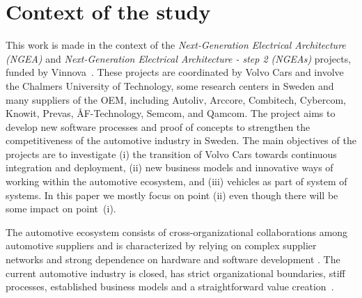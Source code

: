 \section{Context of the study}\label{sec:context}


This work is made in the context of the {\em Next-Generation Electrical Architecture (NGEA)} and {\em Next-Generation Electrical Architecture - step 2 (NGEAs)} projects, funded by Vinnova~\cite{Vinnova}. 
These projects are coordinated by Volvo Cars and involve the Chalmers University of Technology, some research centers in Sweden and many suppliers of the OEM, including Autoliv, Arccore, Combitech, Cybercom, Knowit, Prevas, \AA F-Technology, Semcom, and Qamcom. The project aims to develop new software processes and proof of concepts to strengthen the competitiveness of the automotive industry in Sweden. The main objectives of the projects are to investigate (i) the transition of Volvo Cars towards continuous integration and deployment, (ii) new business models and innovative ways of working within the automotive ecosystem, and (iii) vehicles as part of system of systems. 
In this paper we mostly focus on point (ii) even though there will be some impact on point~(i).

The automotive ecosystem consists of cross-organizational collaborations among automotive suppliers and is characterized by relying on complex supplier networks and strong dependence on hardware and software development \cite{Patrizio2016AAF_Chalmers,Knauss14d.:towards,Broy:2006:CAS:1134285.1134292}.
The current automotive industry is closed, has strict organizational boundaries, stiff processes, established business models and a straightforward value creation~\cite{ConnectedVehicle2012}.


